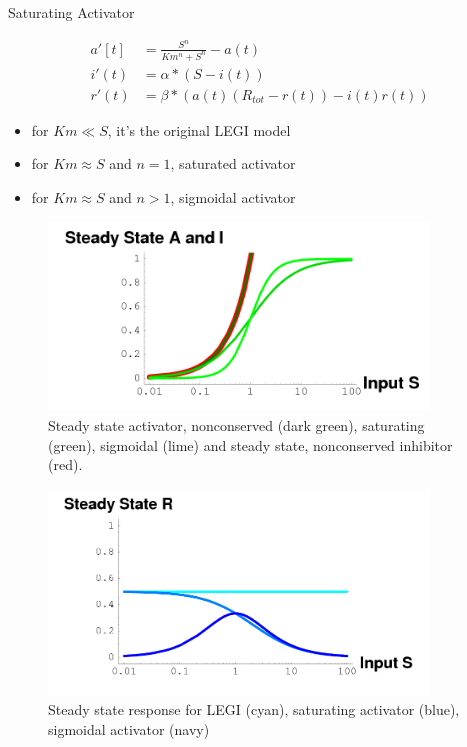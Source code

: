 \documentclass{article}
\begin{document}
Saturating Activator

\begin{align}
    a'[t] &= \frac{ S^n }{ Km^n + S^n } - a(t) \\
    i'(t) &= \alpha * ( S - i(t)) \\
    r'(t) &= \beta * ( a(t) ( R_{tot} - r(t) ) - i(t) r(t) )
\end{align}

\begin{itemize}
    \item for $Km \ll S$, it's the original LEGI model
    \item for $Km \approx S$ and $n=1$, saturated activator
    \item for $Km \approx S$ and $n>1$, sigmoidal activator
\end{itemize}

\begin{figure}
    \centering
    \includegraphics[width=0.9\textwidth]{ssAIR.png}
    \caption{Steady state activator, nonconserved (dark green),
        saturating (green), sigmoidal (lime) and steady state,
        nonconserved inhibitor (red). \label{fig:metric}}
\end{figure}


\begin{figure}
    \centering
    \includegraphics[width=0.9\textwidth]{ssR.png}
    \caption{Steady state response for LEGI (cyan),
        saturating activator (blue), sigmoidal activator (navy)
        \label{fig:metric}}
\end{figure}
\end{document}
